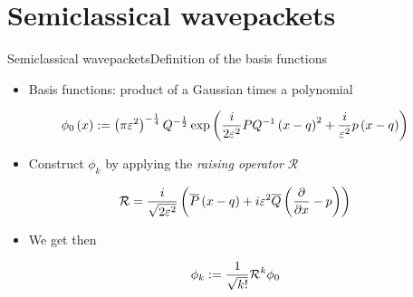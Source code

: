 \documentclass{beamer}
\begin{document}
\section{Semiclassical wavepackets}


\begin{frame}{Semiclassical wavepackets}{Definition of the basis functions}
  \begin{itemize}
  \item Basis functions: product of a Gaussian times a polynomial
  \end{itemize}
  \begin{equation*} \label{eq:hagedorn_groundstate_1d}
    \phi_0 \left( x \right) :=
    \left(\pi\varepsilon^2\right)^{-\frac{1}{4}} Q^{-\frac{1}{2}}
    \exp \left(
      \frac{i}{2\varepsilon^2} PQ^{-1}\left(x-q\right)^2
      + \frac{i}{\varepsilon^2} p\left(x-q\right)
    \right)
  \end{equation*}
  \begin{itemize}
  \item Construct $\phi_k$ by applying the \emph{raising operator} $\mathcal{R}$
  \end{itemize}
  \begin{equation*} \label{eq:definition_ladder_ops}
    \mathcal{R} = \frac{i}{\sqrt{2\varepsilon^2}} \left( \overline{P} \left(x-q\right) + i \varepsilon^2 \overline{Q} \left( \frac{\partial}{\partial x}-p\right) \right)
  \end{equation*}
  \begin{itemize}
  \item We get then
  \end{itemize}
  \begin{equation*}
    \phi_k := \frac{1}{\sqrt{k!}} \mathcal{R}^k \phi_0
  \end{equation*}
\end{frame}
\end{document}
